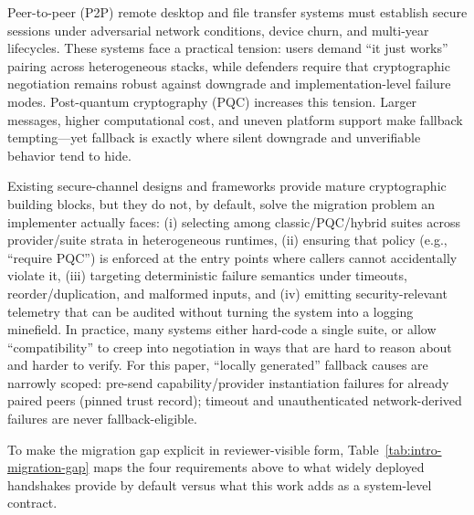 \documentclass[10pt,journal,compsoc]{IEEEtran}
\begin{document}
\maketitle
\IEEEdisplaynontitleabstractindextext


\noindent Peer-to-peer (P2P) remote desktop and file transfer systems must
establish secure sessions under adversarial network conditions, device
churn, and multi-year lifecycles. These systems face a practical
tension: users demand ``it just works'' pairing across heterogeneous
stacks, while defenders require that cryptographic negotiation remains
robust against downgrade and \mbox{implementation-level} failure modes.
Post-quantum cryptography (PQC) increases this tension. Larger messages,
higher computational cost, and uneven platform support make fallback
tempting---yet fallback is exactly where silent downgrade and
unverifiable behavior tend to hide.

Existing secure-channel designs and frameworks provide mature
cryptographic building blocks, but they do not, by default, solve the
migration problem an implementer actually faces: (i) selecting among
classic/PQC/hybrid suites across provider/suite strata in heterogeneous
runtimes, (ii) ensuring that
policy (e.g., ``require PQC'') is enforced at the entry points where
callers cannot accidentally violate it, (iii) targeting deterministic
failure semantics under timeouts, reorder/duplication, and malformed
inputs, and (iv) emitting security-relevant telemetry that can be
audited without turning the system into a logging minefield. In
practice, many systems either hard-code a single suite, or allow
``compatibility'' to creep into negotiation in ways that are hard to
reason about and harder to verify.
For this paper, ``locally generated'' fallback causes are narrowly scoped:
pre-send capability/provider instantiation failures for already paired
peers (pinned trust record); timeout and unauthenticated network-derived
failures are never fallback-eligible.

To make the migration gap explicit in reviewer-visible form,
Table~\ref{tab:intro-migration-gap} maps the four requirements above to
what widely deployed handshakes provide by default versus what this work
adds as a system-level contract.
\end{document}

